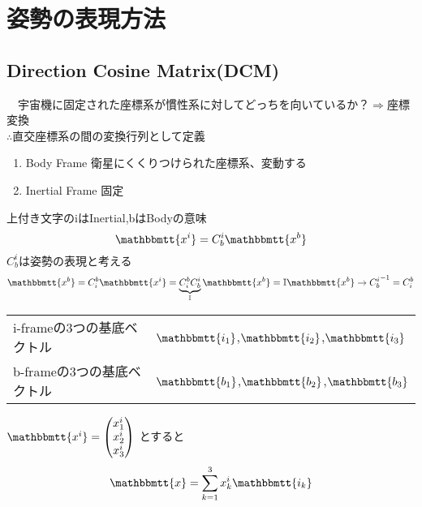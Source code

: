 \documentclass[class=article, crop=false, preview=false, dvipdfmx, a4paper]{standalone}
\begin{document}
\section{姿勢の表現方法}

\subsection{Direction Cosine Matrix(DCM)}
　宇宙機に固定された座標系が慣性系に対してどっちを向いているか？$\Rightarrow$座標変換\\
 $\therefore$直交座標系の間の変換行列として定義
\begin{enumerate}[label = \maru{\theenumi}]
 \item Body Frame 衛星にくくりつけられた座標系、変動する 
 \item Inertial Frame 固定
 \end{enumerate}
 上付き文字のiはInertial,bはBodyの意味
 \[ \mathbbmtt{x^i}=C^i_b\mathbbmtt{x^b} \]
 $C^i_b$は姿勢の表現と考える
 \[ \mathbbmtt{x^b} = C^b_i \mathbbmtt{x^i} = \underbrace{C^b_i C^i_b}_{\mathbb{I}} \mathbbmtt{x^b} = \mathbb{I} \mathbbmtt{x^b}
 	\rightarrow {C^i_b}^{-1} = C^b_i \]

\begin{tabular}{ll}
i-frameの3つの基底ベクトル & $\mathbbmtt{i_1}$,$\mathbbmtt{i_2}$,$\mathbbmtt{i_3}$ \\
b-frameの3つの基底ベクトル & $\mathbbmtt{b_1}$,$\mathbbmtt{b_2}$,$\mathbbmtt{b_3}$
\end{tabular}

$\mathbbmtt{x^i}=
 	\begin{pmatrix}
    	x^i_1\\
        x^i_2\\
        x^i_3\\
    \end{pmatrix}$
とすると
\begin{equation}
\mathbbmtt{x} = \sum_{k=1}^{3} x^i_k \mathbbmtt{i_k} \label{eq:1}
\end{equation}
\end{document}
